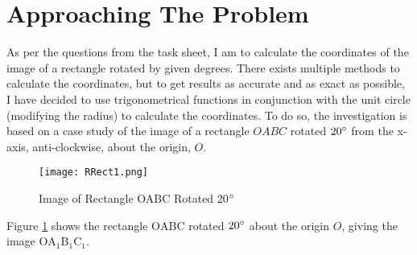 \documentclass{article}
\begin{document}
    \newpage
    \section{Approaching The Problem} As per the questions from the task sheet, I am to calculate the coordinates of the image of a rectangle rotated by given degrees. There exists multiple methods to calculate the coordinates, but to get results as accurate and as exact as possible, I have decided to use trigonometrical functions in conjunction with the unit circle (modifying the radius) to calculate the coordinates. To do so, the investigation is based on a case study of the image of a rectangle $OABC$ rotated $20\degree$ from the x-axis, anti-clockwise, about the origin, $O$.
    \begin{figure}[h!]
        \texttt{[image: RRect1.png]}
        \caption{Image of Rectangle OABC Rotated 20$\degree$}
        \label{fig:rrect1}
    \end{figure} \newline
    Figure \ref{fig:rrect1} shows the rectangle $\mathrm{OABC}$ rotated $20\degree$ about the origin $O$, giving the image $\mathrm{OA_1B_1C_1}$.
    \\\\
    
    
    \newpage
    
\end{document}
